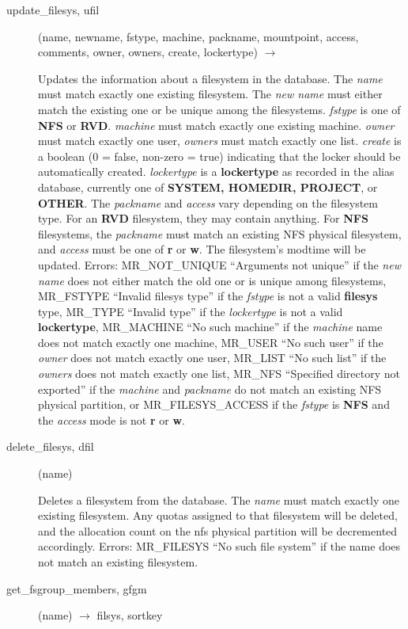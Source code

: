 \begin{description}
\item[update\_filesys, ufil](name, newname, fstype, machine, packname,
mountpoint, access, comments, owner, owners, create, lockertype)
$\rightarrow$

Updates the information about a filesystem in the database.  The
{\em name} must match exactly one existing filesystem.  The {\em new name}
must either match the existing one or be unique among the filesystems.
{\em fstype} is one of {\bf NFS} or {\bf RVD}.  {\em machine} must match
exactly one existing machine.  {\em owner} must match exactly one user,
{\em owners} must match exactly one list.  {\em create} is a boolean (0 =
false, non-zero = true) indicating that the locker should be
automatically created.  {\em lockertype} is a {\bf lockertype} as recorded
in the alias database, currently one of {\bf SYSTEM, HOMEDIR, PROJECT},
or {\bf OTHER}.  The {\em packname} and {\em access} vary depending on the
filesystem type.  For an {\bf RVD} filesystem, they may contain
anything.  For {\bf NFS} filesystems, the {\em packname} must match an
existing NFS physical filesystem, and {\em access} must be one of {\bf r}
or {\bf w}.  The filesystem's modtime will be updated.  Errors:
MR\_NOT\_UNIQUE ``Arguments not unique'' if the {\em new name} does not
either match the old one or is unique among filesystems, MR\_FSTYPE
``Invalid filesys type'' if the {\em fstype} is not a valid {\bf filesys}
type, MR\_TYPE ``Invalid type'' if the {\em lockertype} is not a valid
{\bf lockertype}, MR\_MACHINE ``No such machine'' if the {\em machine} name
does not match exactly one machine, MR\_USER ``No such user'' if the
{\em owner} does not match exactly one user, MR\_LIST ``No such list'' if
the {\em owners} does not match exactly one list, MR\_NFS ``Specified
directory not exported'' if the {\em machine} and {\em packname} do not
match an existing NFS physical partition, or MR\_FILESYS\_ACCESS if the
{\em fstype} is {\bf NFS} and the {\em access} mode is not {\bf r} or {\bf w}.

\item[delete\_filesys, dfil](name)

Deletes a filesystem from the database.  The {\em name} must match
exactly one existing filesystem.  Any quotas assigned to that
filesystem will be deleted, and the allocation count on the nfs
physical partition will be decremented accordingly.  Errors:
MR\_FILESYS ``No such file system'' if the name does not match an
existing filesystem.

\item[get\_fsgroup\_members, gfgm](name) $\rightarrow$ filsys, sortkey


\end{description}

